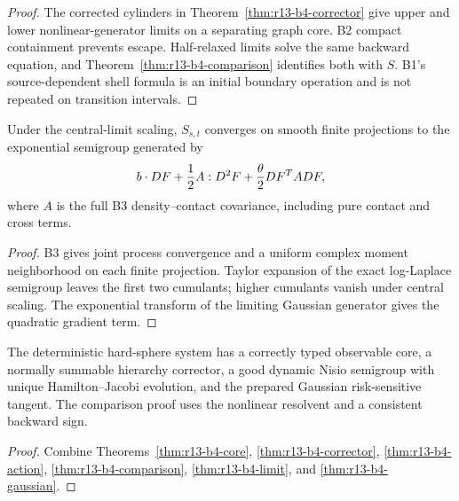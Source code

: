 \begin{proof}
The corrected cylinders in
Theorem~\ref{thm:r13-b4-corrector} give upper and lower nonlinear-generator
limits on a separating graph core.  B2 compact containment prevents escape.
Half-relaxed limits solve the same backward equation, and
Theorem~\ref{thm:r13-b4-comparison} identifies both with $S$.  B1's
source-dependent shell formula is an initial boundary operation and is not
repeated on transition intervals.
\end{proof}

\begin{theorem}
\label{thm:r13-b4-gaussian}
Under the central-limit scaling, $S_{s,t}$ converges on smooth finite
projections to the exponential semigroup generated by
\[
 b\cdot DF+{1\over2}A:D^2F
 +{\theta\over2}DF^TADF,
\]
where $A$ is the full B3 density--contact covariance, including pure contact
and cross terms.
\end{theorem}

\begin{proof}
B3 gives joint process convergence and a uniform complex moment neighborhood
on each finite projection.  Taylor expansion of the exact log-Laplace
semigroup leaves the first two cumulants; higher cumulants vanish under
central scaling.  The exponential transform of the limiting Gaussian
generator gives the quadratic gradient term.
\end{proof}

\begin{theorem}
\label{thm:r13-b4-main}
The deterministic hard-sphere system has a correctly typed observable core,
a normally summable hierarchy corrector, a good dynamic Nisio semigroup with
unique Hamilton--Jacobi evolution, and the prepared Gaussian risk-sensitive
tangent.  The comparison proof uses the nonlinear resolvent and a consistent
backward sign.
\end{theorem}

\begin{proof}
Combine Theorems~\ref{thm:r13-b4-core},
\ref{thm:r13-b4-corrector}, \ref{thm:r13-b4-action},
\ref{thm:r13-b4-comparison}, \ref{thm:r13-b4-limit}, and
\ref{thm:r13-b4-gaussian}.
\end{proof}
